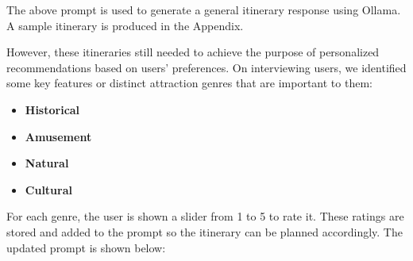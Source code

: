\documentclass[sigconf,authordraft]{acmart}
\begin{document}
    The above prompt is used to generate a general itinerary response using Ollama. A sample itinerary is produced in the Appendix.

    However, these itineraries still needed to achieve the purpose of personalized recommendations based on users' preferences. On interviewing users, we identified some key features or distinct attraction genres that are important to them:

    \begin{itemize}
      \item \textbf{Historical}
      \item \textbf{Amusement}
      \item \textbf{Natural}
      \item \textbf{Cultural}
    \end{itemize}

    For each genre, the user is shown a slider from 1 to 5 to rate it. These ratings are stored and added to the prompt so the itinerary can be planned accordingly. The updated prompt is shown below:



\end{document}
